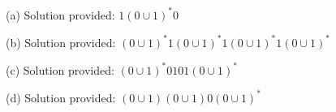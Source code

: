 
(a) Solution provided: $1 (0 \cup 1)^* 0$

(b) Solution provided: $(0 \cup 1)^* 1 (0 \cup 1)^* 1 (0 \cup 1)^* 1 (0 \cup 1)^*$

(c) Solution provided: $(0 \cup 1)^* 0101 (0 \cup 1)^*$

(d) Solution provided: $(0 \cup 1)(0 \cup 1)0(0 \cup 1)^*$



